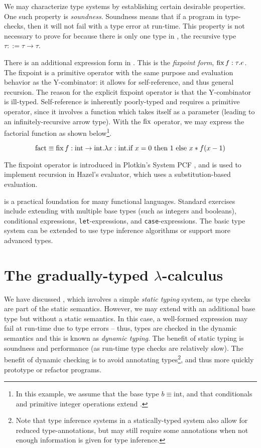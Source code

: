 We may characterize type systems by establishing certain desirable properties. One such property is \textit{soundness}. Soundness means that if a program in \stlc{} type-checks, then it will not fail with a type error at run-time. This property is not necessary to prove for \ulc{} because there is only one type in \ulc{}, the recursive type $\tau::=\tau\to\tau$.

There is an additional expression form in \stlc{}. This is the \textit{fixpoint form}, $\operatorname{fix} f:\tau.e$. The fixpoint is a primitive operator with the same purpose and evaluation behavior as the Y-combinator: it allows for self-reference, and thus general recursion. The reason for the explicit fixpoint operator is that the Y-combinator is ill-typed. Self-reference is inherently poorly-typed and requires a primitive operator, since it involves a function which takes itself as a parameter (leading to an infinitely-recursive arrow type). With the $\operatorname{fix}$ operator, we may express the factorial function as shown below\footnote{In this example, we assume that the base type $b\equiv\text{int}$, and that conditionals and primitive integer operations extend \stlc{}.}.

\begin{equation*}
  \text{fact}\equiv\operatorname{fix} f:\text{int}\to \text{int}.\lambda x:\text{int}.\text{if }x=0\text{ then }1\text{ else }x*f(x-1)
\end{equation*}

The fixpoint operator is introduced in Plotkin's System PCF \cite{harper2016practical}, and is used to implement recursion in Hazel's evaluator, which uses a substitution-based evaluation.

\stlc{} is a practical foundation for many functional languages. Standard exercises include extending \stlc{} with multiple base types (such as integers and booleans), conditional expressions, \texttt{let}-expressions, and \texttt{case}-expressions. The basic type system can be extended to use type inference algorithms or support more advanced types.

\section{The gradually-typed $\lambda$-calculus}
\label{sec:gradual}

We have discussed \stlc{}, which involves a simple \textit{static typing} system, as type checks are part of the static semantics. However, we may extend \ulc{} with an additional base type but without a static semantics. In this case, a well-formed expression may fail at run-time due to type errors -- thus, types are checked in the dynamic semantics and this is known as \textit{dynamic typing}. The benefit of static typing is soundness and performance (as run-time type checks are relatively slow). The benefit of dynamic checking is to avoid annotating types\footnote{Note that type inference systems in a statically-typed system also allow for reduced type-annotations, but may still require some annotations when not enough information is given for type inference.}, and thus more quickly prototype or refactor programs.

